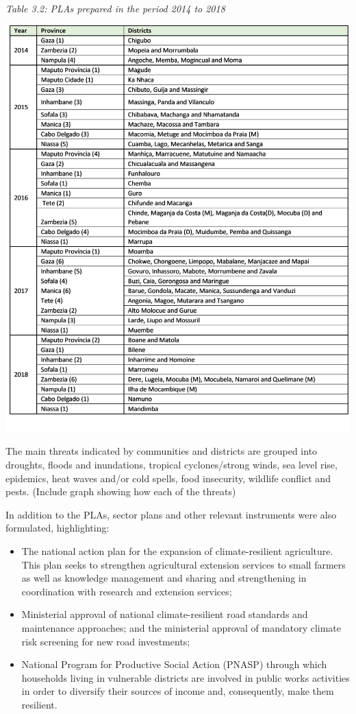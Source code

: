 \documentclass[
]{book}
\begin{document}
\emph{Table 3.2: PLAs prepared in the period 2014 to 2018}

\includegraphics{PLAs.png}

The main threats indicated by communities and districts are grouped into droughts, floods and inundations, tropical cyclones/strong winds, sea level rise, epidemics, heat waves and/or cold spells, food insecurity, wildlife conflict and pests. (Include graph showing how each of the threats)

In addition to the PLAs, sector plans and other relevant instruments were also formulated, highlighting:

\begin{itemize}
\item
  The national action plan for the expansion of climate-resilient agriculture. This plan seeks to strengthen agricultural extension services to small farmers as well as knowledge management and sharing and strengthening in coordination with research and extension services;
\item
  Ministerial approval of national climate-resilient road standards and maintenance approaches; and the ministerial approval of mandatory climate risk screening for new road investments;
\item
  National Program for Productive Social Action (PNASP) through which households living in vulnerable districts are involved in public works activities in order to diversify their sources of income and, consequently, make them resilient.
\end{itemize}
\end{document}
